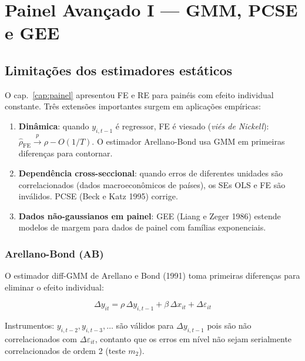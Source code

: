 \chapter{Painel Avançado I — GMM, PCSE e GEE}
\label{cap:painel_avancado}

\section{Limitações dos estimadores estáticos}

O cap.~\ref{cap:painel} apresentou FE e RE para painéis com efeito individual
constante. Três extensões importantes surgem em aplicações empíricas:

\begin{enumerate}
  \item \textbf{Dinâmica}: quando $y_{i,t-1}$ é regressor, FE é viesado
  (\emph{viés de Nickell}): $\hat\rho_{\mathrm{FE}} \xrightarrow{p} \rho - O(1/T)$.
  O estimador Arellano-Bond usa GMM em primeiras diferenças para contornar.
  \item \textbf{Dependência cross-seccional}: quando erros de diferentes
  unidades são correlacionados (dados macroeconômicos de países), os SEs
  OLS e FE são inválidos. PCSE (Beck e Katz 1995) corrige.
  \item \textbf{Dados não-gaussianos em painel}: GEE (Liang e Zeger 1986)
  estende modelos de margem para dados de painel com famílias exponenciais.
\end{enumerate}

\subsection*{Arellano-Bond (AB)}

O estimador diff-GMM de Arellano e Bond (1991) toma primeiras diferenças
para eliminar o efeito individual:

\[
  \Delta y_{it} = \rho\,\Delta y_{i,t-1} + \beta\,\Delta x_{it} + \Delta\varepsilon_{it}
\]

Instrumentos: $y_{i,t-2}, y_{i,t-3}, \ldots$ são válidos para $\Delta y_{i,t-1}$
pois são não correlacionados com $\Delta\varepsilon_{it}$, contanto que os
erros em nível não sejam serialmente correlacionados de ordem 2 (teste $m_2$).

